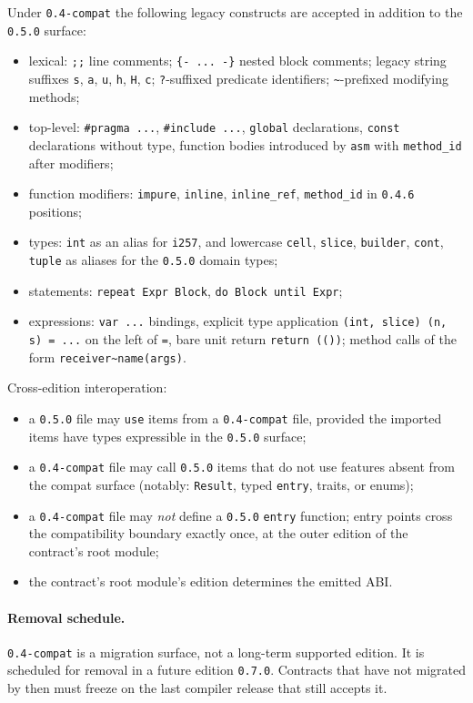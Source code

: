 \documentclass[12pt,oneside]{article}
\begin{document}
Under \verb|0.4-compat| the following legacy constructs are accepted in
addition to the \verb|0.5.0| surface:

\begin{itemize}
\item lexical: \verb|;;| line comments; \verb|{- ... -}| nested block
comments; legacy string suffixes \verb|s|, \verb|a|, \verb|u|, \verb|h|,
\verb|H|, \verb|c|; \verb|?|-suffixed predicate identifiers;
\verb|~|-prefixed modifying methods;
\item top-level: \verb|#pragma ...|, \verb|#include ...|, \verb|global|
declarations, \verb|const| declarations without type, function bodies
introduced by \verb|asm| with \verb|method_id| after modifiers;
\item function modifiers: \verb|impure|, \verb|inline|, \verb|inline_ref|,
\verb|method_id| in \verb|0.4.6| positions;
\item types: \verb|int| as an alias for \verb|i257|, and lowercase
\verb|cell|, \verb|slice|, \verb|builder|, \verb|cont|, \verb|tuple| as
aliases for the \verb|0.5.0| domain types;
\item statements: \verb|repeat Expr Block|, \verb|do Block until Expr|;
\item expressions: \verb|var ...| bindings, explicit type application
\verb|(int, slice) (n, s) = ...| on the left of \verb|=|, bare unit
return \verb|return (())|; method calls of the form
\verb|receiver~name(args)|.
\end{itemize}

Cross-edition interoperation:

\begin{itemize}
\item a \verb|0.5.0| file may \verb|use| items from a \verb|0.4-compat| file,
provided the imported items have types expressible in the \verb|0.5.0|
surface;
\item a \verb|0.4-compat| file may call \verb|0.5.0| items that do not use
features absent from the compat surface (notably: \verb|Result|, typed
\verb|entry|, traits, or enums);
\item a \verb|0.4-compat| file may \emph{not} define a \verb|0.5.0|
\verb|entry| function; entry points cross the compatibility boundary
exactly once, at the outer edition of the contract's root module;
\item the contract's root module's edition determines the emitted ABI.
\end{itemize}

\paragraph{Removal schedule.} \verb|0.4-compat| is a migration surface, not a
long-term supported edition. It is scheduled for removal in a future edition
\verb|0.7.0|. Contracts that have not migrated by then must freeze on the
last compiler release that still accepts it.
\end{document}
